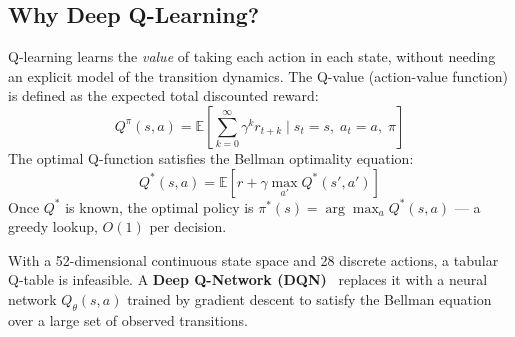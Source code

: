 \documentclass[12pt,a4paper]{report}
\begin{document}
\subsection{Why Deep Q-Learning?}

Q-learning learns the \emph{value} of taking each action in each state,
without needing an explicit model of the transition dynamics. The Q-value
(action-value function) is defined as the expected total discounted reward:
\begin{equation}
    Q^\pi(s, a) = \mathbb{E}\!\left[\sum_{k=0}^{\infty} \gamma^k r_{t+k}
    \;\Big|\; s_t = s,\; a_t = a,\; \pi\right]
\end{equation}
The optimal Q-function satisfies the Bellman optimality equation:
\begin{equation}
    Q^*(s, a) = \mathbb{E}\!\left[r + \gamma \max_{a'} Q^*(s', a')\right]
\end{equation}
Once $Q^*$ is known, the optimal policy is $\pi^*(s) = \arg\max_a Q^*(s,a)$
--- a greedy lookup, $O(1)$ per decision.

With a 52-dimensional continuous state space and 28 discrete actions, a
tabular Q-table is infeasible. A \textbf{Deep Q-Network (DQN)}~\cite{mnih2015}
replaces it with a neural network $Q_\theta(s, a)$ trained by gradient descent
to satisfy the Bellman equation over a large set of observed transitions.
\end{document}
